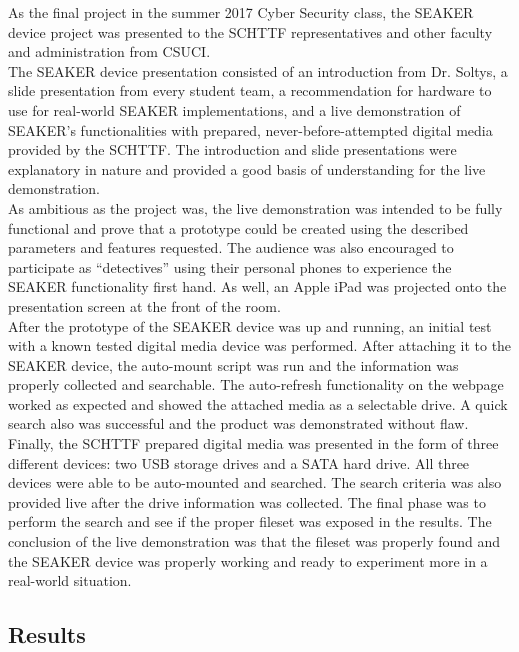 \documentclass[12pt]{article}
\begin{document}
As the final project in the summer 2017 Cyber Security class, the SEAKER device
project was presented to the SCHTTF representatives and other faculty and
administration from CSUCI.\\

The SEAKER device presentation consisted of an introduction from Dr. Soltys, a 
slide presentation from every student team, a recommendation for hardware to 
use for real-world SEAKER implementations, and a live demonstration of SEAKER's 
functionalities with prepared, never-before-attempted digital media provided by the
SCHTTF.  The introduction and slide presentations were explanatory in nature
and provided a good basis of understanding for the live demonstration.\\

As ambitious as the project was, the live demonstration was intended to be fully
functional and prove that a prototype could be created using the described
parameters and features requested.  The audience was also encouraged to participate
as ``detectives'' using their personal phones to experience the SEAKER functionality
first hand.  As well, an Apple iPad was projected onto the presentation screen at
the front of the room.\\

After the prototype of the SEAKER device was up and running, an initial test with a
known tested digital media device was performed.  After attaching it to the SEAKER
device, the auto-mount script was run and the information was properly collected
and searchable.  The auto-refresh functionality on the webpage worked as expected
and showed the attached media as a selectable drive.  A quick search also was 
successful and the product was demonstrated without flaw.\\

Finally, the SCHTTF prepared digital media was presented in the form of three
different devices: two USB storage drives and a SATA hard drive.  All three devices
were able to be auto-mounted and searched.  The search criteria was also provided
live after the drive information was collected.  The final phase was to perform the
search and see if the proper fileset was exposed in the results.  The conclusion
of the live demonstration was that the fileset was properly found and the SEAKER
device was properly working and ready to experiment more in a real-world situation.

\subsection{Results}
\end{document}
